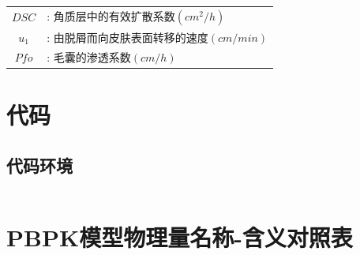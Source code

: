 \documentclass[a4paper,punct=banjiao,twoside]{ctexrep}
\theoremstyle{plain}
\theoremstyle{definition}
\theoremstyle{remark}
\begin{document}
\begin{table}[htbp]
  \centering
  \begin{tabular}[t]{c*{1}{l}}


    
    $DSC$ &: 角质层中的有效扩散系数$(cm^2/h)$ \\ 
  
    $u_1$  &: 由脱屑而向皮肤表面转移的速度$(cm/min)$ \\ 
  
    $Pfo$ &: 毛囊的渗透系数$(cm/h)$ \\ 

  \end{tabular}
\end{table}  









































\clearpage
\mbox{}
\thispagestyle{empty}

\appendix
\chapter{代码}
\section{代码环境}
\begin{lstlisting}[language=PYTHON]

\end{lstlisting}
\chapter{PBPK模型物理量名称-含义对照表}
\end{document}
